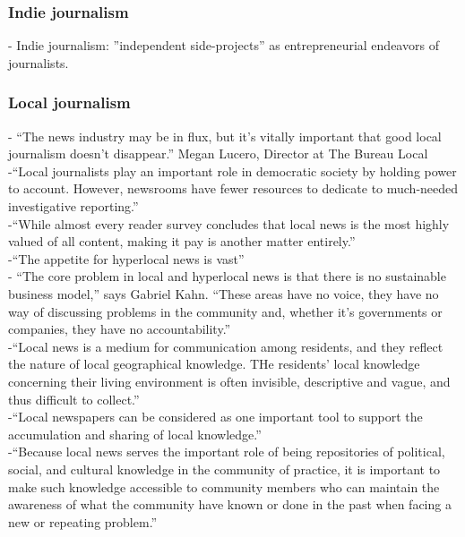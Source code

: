 \subsubsection{Indie journalism}
-{\color{orange} Indie journalism: ”independent side-projects” as entrepreneurial endeavors of journalists.\cite{Granger2020a}}\\


\subsubsection{Local journalism}
-{\color{orange} “The news industry may be in flux, but it’s vitally important that good local journalism doesn’t disappear.” Megan Lucero, Director at The Bureau Local\cite{DNIFund2018}}\\
-{\color{orange}“Local journalists play an important role in democratic society by holding power to account. However, newsrooms have fewer resources to dedicate to much-needed investigative reporting.”\cite{DNIFund2018}}\\
-{\color{orange}“While almost every reader survey concludes that local news is the most highly valued of all content, making it pay is another matter entirely.”\cite{DNIFund2018}}\\
-{\color{orange}“The appetite for hyperlocal news is vast”\cite{DNIFund2018}}\\
-{\color{orange} “The core problem in local and hyperlocal news is that there is no sustainable business model,” says Gabriel Kahn. “These areas have no voice, they have no way of discussing problems in the community and, whether it’s governments or companies, they have no accountability.”\cite{Granger2020}}\\
-{\color{orange}“Local news is a medium for communication among residents, and they reflect the nature of local geographical knowledge. THe residents’ local knowledge concerning their living environment is often invisible, descriptive and vague, and thus difficult to collect.”\cite{Cai2016}}\\
-{\color{orange}“Local newspapers can be considered as one important tool to support the accumulation and sharing of local knowledge.”\cite{Cai2016}}\\
-{\color{orange}“Because local news serves the important role of being repositories of political, social, and cultural knowledge in the community of practice, it is important to make such knowledge accessible to community members who can maintain the awareness of what the community have known or done in the past when facing a new or repeating problem.”\cite{Cai2016}}\\
